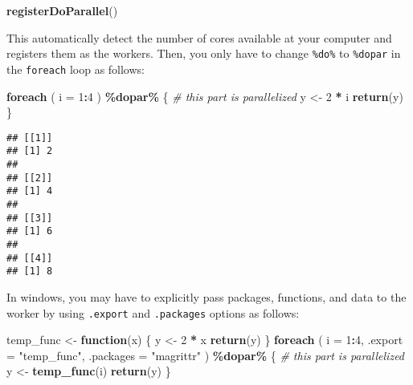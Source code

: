 \documentclass[
]{book}
\newenvironment{Shaded}{\begin{snugshade}}{\end{snugshade}}
\newcommand{\AttributeTok}[1]{\textcolor[rgb]{0.13,0.29,0.53}{#1}}
\newcommand{\CommentTok}[1]{\textcolor[rgb]{0.56,0.35,0.01}{\textit{#1}}}
\newcommand{\ControlFlowTok}[1]{\textcolor[rgb]{0.13,0.29,0.53}{\textbf{#1}}}
\newcommand{\DecValTok}[1]{\textcolor[rgb]{0.00,0.00,0.81}{#1}}
\newcommand{\FunctionTok}[1]{\textcolor[rgb]{0.13,0.29,0.53}{\textbf{#1}}}
\newcommand{\NormalTok}[1]{#1}
\newcommand{\OtherTok}[1]{\textcolor[rgb]{0.56,0.35,0.01}{#1}}
\newcommand{\SpecialCharTok}[1]{\textcolor[rgb]{0.81,0.36,0.00}{\textbf{#1}}}
\newcommand{\StringTok}[1]{\textcolor[rgb]{0.31,0.60,0.02}{#1}}
\begin{document}
\begin{Shaded}
\begin{Highlighting}[]
\FunctionTok{registerDoParallel}\NormalTok{()}
\end{Highlighting}
\end{Shaded}

This automatically detect the number of cores available at your computer and registers them as the workers. Then, you only have to change \texttt{\%do\%} to \texttt{\%dopar} in the \texttt{foreach} loop as follows:

\begin{Shaded}
\begin{Highlighting}[]
\FunctionTok{foreach}\NormalTok{ (}
  \AttributeTok{i =} \DecValTok{1}\SpecialCharTok{:}\DecValTok{4}
\NormalTok{  ) }\SpecialCharTok{\%dopar\%}\NormalTok{ \{}
    \CommentTok{\# this part is parallelized}
\NormalTok{    y }\OtherTok{\textless{}{-}} \DecValTok{2} \SpecialCharTok{*}\NormalTok{ i}
    \FunctionTok{return}\NormalTok{(y)}
\NormalTok{\}}
\end{Highlighting}
\end{Shaded}

\begin{verbatim}
## [[1]]
## [1] 2
## 
## [[2]]
## [1] 4
## 
## [[3]]
## [1] 6
## 
## [[4]]
## [1] 8
\end{verbatim}

In windows, you may have to explicitly pass packages, functions, and data to the worker by using \texttt{.export} and \texttt{.packages} options as follows:

\begin{Shaded}
\begin{Highlighting}[]
\NormalTok{temp\_func }\OtherTok{\textless{}{-}} 
  \ControlFlowTok{function}\NormalTok{(x) \{}
\NormalTok{    y }\OtherTok{\textless{}{-}} \DecValTok{2} \SpecialCharTok{*}\NormalTok{ x}
    \FunctionTok{return}\NormalTok{(y)}
\NormalTok{\}}
\FunctionTok{foreach}\NormalTok{ (}
  \AttributeTok{i =} \DecValTok{1}\SpecialCharTok{:}\DecValTok{4}\NormalTok{, }
  \AttributeTok{.export =} \StringTok{"temp\_func"}\NormalTok{,}
  \AttributeTok{.packages =} \StringTok{"magrittr"}
\NormalTok{  ) }\SpecialCharTok{\%dopar\%}\NormalTok{ \{}
    \CommentTok{\# this part is parallelized}
\NormalTok{    y }\OtherTok{\textless{}{-}} \FunctionTok{temp\_func}\NormalTok{(i)}
    \FunctionTok{return}\NormalTok{(y)}
\NormalTok{\}}
\end{Highlighting}
\end{Shaded}
\end{document}
